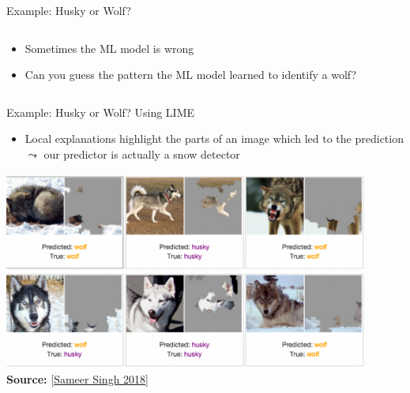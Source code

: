 \documentclass[11pt,compress,t,notes=noshow, aspectratio=169, xcolor=table]{beamer}
\begin{document}
\begin{frame}[t]{Example: Husky or Wolf?}
\begin{columns}[T, onlytextwidth]
	\begin{column}{0.55\textwidth}
	    
	\begin{itemize}
		\item Sometimes the ML model is wrong
		\item Can you guess the pattern the ML model learned to identify a wolf?
	\end{itemize}
	    
	\end{column}
	    
	\end{columns}

\end{frame}


\begin{frame}[t]{Example: Husky or Wolf? Using LIME}
	\begin{itemize}
		\item Local explanations highlight the parts of an image which led to the prediction\\
        $\leadsto$ our predictor is actually a snow detector 
	\end{itemize}
    
	\begin{center}
		\includegraphics[width=0.9\textwidth]{figure/lime-wolfhusky3.png}\\
		{\textbf{Source:} [\href{http://www.facweb.iitkgp.ac.in/~niloy/COURSE/Spring2018/IntelligentSystem/PPT_2018/why_should_i_trust_ppt.pdf}{Sameer Singh 2018}]}
	\end{center}







\end{frame}
\end{document}
